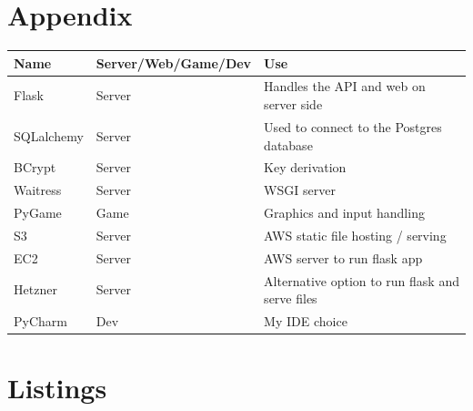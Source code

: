 \documentclass[a4paper, 11pt]{report}
\begin{document}
\section{Appendix}
\begin{table}[h!]
\begin{tabular}{|l|l|l|}
\hline
\rowcolor[HTML]{C0C0C0} 
{\color[HTML]{000000} \textbf{Name}} & {\color[HTML]{000000} \textbf{Server/Web/Game/Dev}} & {\color[HTML]{000000} \textbf{Use}}             \\ \hline
Flask                                & Server                                              & Handles the API and web on server side          \\ \hline
SQLalchemy                           & Server                                              & Used to connect to the Postgres database        \\ \hline
BCrypt                               & Server                                              & Key derivation                                  \\ \hline
Waitress                             & Server                                              & WSGI server                                     \\ \hline
PyGame                               & Game                                                & Graphics and input handling                     \\ \hline
S3                                   & Server                                              & AWS static file hosting / serving               \\ \hline
EC2                                  & Server                                              & AWS server to run flask app                     \\ \hline
Hetzner                              & Server                                              & Alternative option to run flask and serve files \\ \hline
PyCharm                              & Dev                                                 & My IDE choice                                   \\ \hline
\end{tabular}
\end{table}

\section{Listings}
\listoflistings
\end{document}

